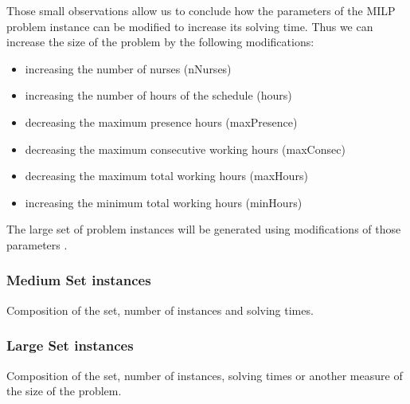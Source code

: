 Those small observations allow us to conclude how the parameters of the MILP problem instance can be modified to increase its solving time. Thus we can increase the size of the problem by the following modifications:\\
\begin{itemize}
	\item increasing the number of nurses (nNurses)
	\item increasing the number of hours of the schedule (hours)
	\item decreasing the maximum presence hours (maxPresence)
	\item decreasing the maximum consecutive working hours (maxConsec)
	\item decreasing the maximum total working hours (maxHours)
	\item increasing the minimum total working hours (minHours)
\end{itemize}
The large set of problem instances will be generated using modifications of those parameters .


\subsubsection{Medium Set instances}

Composition of the set, number of instances and solving times.

\subsubsection{Large Set instances}

Composition of the set, number of instances, solving times or another measure of the size of the problem.

